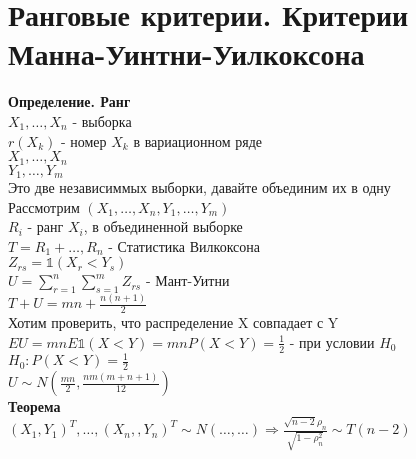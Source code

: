 \documentclass{article}
\newcommand\0{\mathbb{0}}
\newcommand\1{\mathbb{1}}
\newcommand{\Rto}{\Rightarrow}
\begin{document}
\section{Ранговые критерии. Критерии Манна-Уинтни-Уилкоксона}
\textbf{Определение. Ранг}\\
$X_1, \dots, X_n$ - выборка\\
$r(X_k)$ - номер $X_k$ в вариационном ряде\\
$X_1, \dots, X_n$\\
$Y_1, \dots, Y_m$\\
Это две независиммых выборки, давайте объединим их в одну\\
Рассмотрим $(X_1, \dots, X_n, Y_1, \dots, Y_m)$\\
$R_i$ - ранг $X_i$, в объединенной выборке\\
$T = R_1 + \dots, R_n$ - Статистика Вилкоксона\\
$Z_{rs} = \mathbb{1}(X_r < Y_s)$\\
$U = \displaystyle\sum_{r = 1}^n \displaystyle\sum_{s = 1}^m Z_{rs}$ - Мант-Уитни\\
$T + U = mn + \frac{n(n + 1)}{2}$\\
Хотим проверить, что распределение X совпадает с Y\\
$EU = mn E \mathbb{1}(X < Y) = mnP(X < Y) = \frac{1}{2}$ - при условии $H_0$\\
$H_0: P(X < Y) = \frac{1}{2}$\\
$U \sim N(\frac{mn}{2}, \frac{nm(m + n + 1)}{12})$\\
\textbf{Теорема}\\
$(X_1, Y_1)^T, \dots, (X_n, , Y_n)^T \sim N(\dots, \dots) \Rto \frac{\sqrt{n -2} \rho_n}{\sqrt{1 - \rho_n^2}} \sim T(n - 2)$\\
\end{document}
